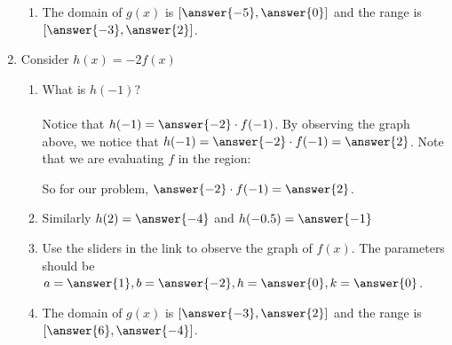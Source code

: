 \documentclass{ximera}
\begin{document}
\begin{question}
\begin{enumerate}
\begin{enumerate}
\item The domain of $g(x)$ is $[\answer{-5}, \answer{0}]$ and the range is $[\answer{-3}, \answer{2}]$.

\end{enumerate}


\item Consider $h(x)=-2f(x)$
\begin{enumerate}
\item What is $h(-1)$?  \\ \\ Notice that $h(-1)=\answer{-2}\cdot f(-1)$.  By observing the graph above, we notice that $h(-1)=\answer{-2}\cdot f(-1)=\answer{2}$.  Note that we are evaluating $f$ in the region:

\begin{multipleChoice}
\end{multipleChoice}

So for our problem, $\answer{-2}\cdot f(-1)=\answer{2}$.

\item Similarly $h(2)=\answer{-4}$ and $h(-0.5)=\answer{-1}$

\item Use the sliders in the link to observe the graph of $f(x)$.  The parameters should be $a=\answer{1}, b=\answer{-2}, h=\answer{0}, k=\answer{0}$.

\item The domain of $g(x)$ is $[\answer{-3}, \answer{2}]$ and the range is $[\answer{6}, \answer{-4}]$.

\end{enumerate}





\end{enumerate}

\end{question}
\end{document}
